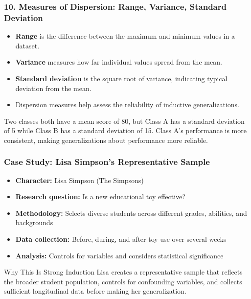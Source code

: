 \documentclass{beamer}
\begin{document}
\begin{frame}
\frametitle{10. Measures of Dispersion: Range, Variance, Standard Deviation}
\begin{itemize}
\item \textbf{Range} is the difference between the maximum and minimum values in a dataset.
\item \textbf{Variance} measures how far individual values spread from the mean.
\item \textbf{Standard deviation} is the square root of variance, indicating typical deviation from the mean.
\item Dispersion measures help assess the reliability of inductive generalizations.
\end{itemize}

\begin{example}
Two classes both have a mean score of 80, but Class A has a standard deviation of 5 while Class B has a standard deviation of 15. Class A's performance is more consistent, making generalizations about performance more reliable.
\end{example}
\end{frame}


\begin{frame}
    \frametitle{Case Study: Lisa Simpson's Representative Sample}
    
    \begin{itemize}
    \item \textbf{Character:} Lisa Simpson (The Simpsons)
    \item \textbf{Research question:} Is a new educational toy effective?
    \item \textbf{Methodology:} Selects diverse students across different grades, abilities, and backgrounds
    \item \textbf{Data collection:} Before, during, and after toy use over several weeks
    \item \textbf{Analysis:} Controls for variables and considers statistical significance
    \end{itemize}
    
    \begin{block}{Why This Is Strong Induction}
    Lisa creates a representative sample that reflects the broader student population, controls for confounding variables, and collects sufficient longitudinal data before making her generalization.
    \end{block}
    \end{frame}
\end{document}
